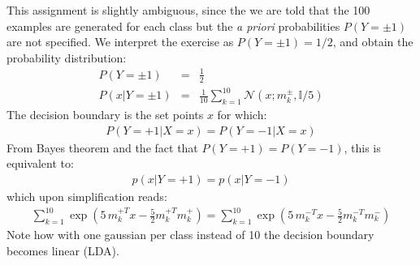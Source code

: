 

This assignment is slightly ambiguous, since the  we are told that the 100 examples 
are generated for each class but the \textit{a priori} probabilities $P(Y = \pm 1)$
are not specified. We interpret the exercise as $P(Y = \pm 1) = 1/2$, and obtain the 
probability distribution:
\begin{eqnarray}
P(Y = \pm 1) & = & \frac{1}{2} \\
P(x | Y = \pm 1) & = & \frac{1}{10} \sum_{k=1}^{10} \mathcal{N}(x ; m_k ^{\pm}, \mathbb{I} / 5)
\end{eqnarray}
The decision boundary is the set points $x$ for which:
\begin{eqnarray}
P(Y = +1 |X = x) = P(Y = -1| X = x)
\end{eqnarray}
From Bayes theorem and the fact that $P(Y = +1) = P(Y =-1)$, this is equivalent to:
\begin{eqnarray}
p(x|Y = +1) = p(x|Y = -1)
\end{eqnarray}
which upon simplification reads:
\begin{eqnarray}
\sum_{k=1}^{10} \exp \left( 5\,m_k ^{+ T} x - \frac{5}{2} m_k ^{+ T} m_k^+ \right) = 
\sum_{k=1}^{10} \exp \left( 5\,m_k ^{- T} x - \frac{5}{2} m_k ^{- T} m_k^- \right)
\end{eqnarray}
Note how with one gaussian per class instead of 10 the decision boundary becomes 
linear (LDA).